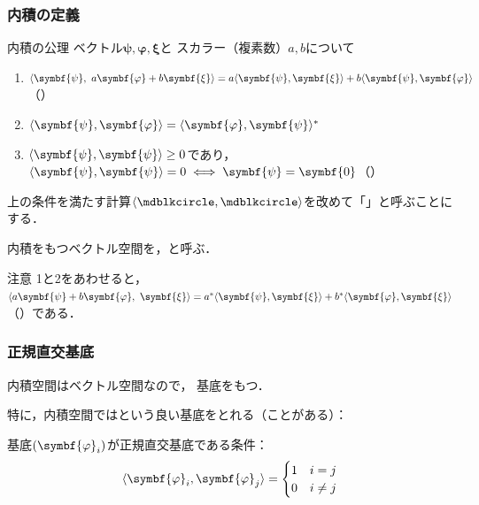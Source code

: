 \documentclass[
    10pt,
    ]{sotsu-beamer}
\begin{document}
\begin{frame}[label={frame:definition-of-inner-product}]
    \frametitle{内積の定義}


    \begin{block}{内積の公理}
        ベクトル$\symbf{\psi}, \symbf{\varphi}, \symbf{\xi}$と
        スカラー（複素数）$a, b$について
        \begin{enumerate}
            \item $\iparen{\symbf{\psi}, \  a\symbf{\varphi} + b\symbf{\xi}} = a\iparen{\symbf{\psi}, \symbf{\xi}} + b\iparen{\symbf{\psi}, \symbf{\varphi}}$（）
            \item $\iparen{\symbf{\psi}, \symbf{\varphi}} = \conj{\iparen{\symbf{\varphi}, \symbf{\psi}}}$
            \item $\iparen{\symbf{\psi}, \symbf{\psi}} \geq 0$であり，
                $\iparen{\symbf{\psi}, \symbf{\psi}} = 0 \iff \symbf{\psi} = \symbf{0}$（）
        \end{enumerate}
    \end{block}

    \pause

    上の条件を満たす計算$\iparen{\bigdot, \bigdot}$を改めて「」と呼ぶことにする．

    内積をもつベクトル空間を，と呼ぶ．

    \pause

    \begin{alertblock}{注意}
        1と2をあわせると，
        $\iparen{a\symbf{\psi} + b\symbf{\varphi}, \  \symbf{\xi}} = \conj{a}\iparen{\symbf{\psi}, \symbf{\xi}} + \conj{b}\iparen{\symbf{\varphi}, \symbf{\xi}}$（）である．
    \end{alertblock}


\end{frame}


\begin{frame}
    \frametitle{正規直交基底}

    内積空間はベクトル空間なので，
    基底をもつ．

    特に，内積空間ではという良い基底をとれる（ことがある）：

    基底$\sequ{\symbf{\varphi}_i}$が正規直交基底である条件：
    \begin{equation*}
        \iparen{ \symbf{\varphi}_i, \symbf{\varphi}_j }
        = \begin{cases}
            1  &  i = j  \\
            0  &  i \neq j  
        \end{cases}
    \end{equation*}

\end{frame}
\end{document}
